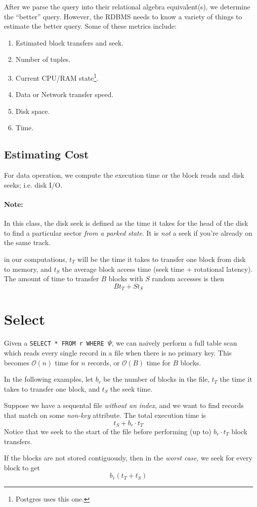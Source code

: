 \documentclass{report}
\newenvironment{example}{\begin{tcolorbox}[title={Example},colback=green!5!white,colframe=black!75!green]}{\end{tcolorbox}}
\renewcommand{\tt}[1]{\texttt{{#1}}}
\renewcommand{\it}[1]{\textit{{#1}}}
\begin{document}
After we parse the query into their relational algebra equivalent(s), we
determine the ``better'' query. However, the RDBMS needs to know a variety of
things to estimate the better query. Some of these metrics include:
\begin{enumerate}[label=(\arabic*)]
    \item Estimated block transfers and seek.
    \item Number of tuples.
    \item Current CPU/RAM state\footnote{Postgres uses this one.}.
    \item Data or Network transfer speed.
    \item Disk space.
    \item Time.
\end{enumerate}

\subsection{Estimating Cost}
For data operation, we compute the execution time or the block reads and disk
seeks; i.e. disk I/O.
\paragraph{Note:} In this class, the disk seek is defined as the time it takes
for the head of the disk to find a particular sector \it{from a parked state}.
It is \it{not} a seek if you're already on the same track.
\vspace{1em}

in our computations, $t_T$ will be the time it takes to transfer one block from
disk to memory, and $t_S$ the average block access time (seek time $+$
rotational latency). The amount of time to transfer $B$ blocks with $S$ random
accesses is then
\[Bt_T + St_S\]

\section{Select}
Given a \tt{SELECT * FROM r WHERE $\Psi$}, we can naively perform a full table
scan which reads every single record in a file when there is no primary key.
This becomes $\mathcal{O}(n)$ time for $n$ records, or $\mathcal{O}(B)$ time for
$B$ blocks.

In the following examples, let $b_r$ be the number of blocks in the file, $t_T$
the time it takes to transfer one block, and $t_S$ the seek time.
\begin{example}
    Suppose we have a sequental file \it{without an index}, and we want to find
    records that match on some \it{non-key} attribute. The total execution time is
    \[t_S + b_r \cdot t_T\]
    Notice that we seek to the start of the file before performing (up to)
    $b_r \cdot t_T$ block transfers.
    \vspace{1em}

    If the blocks are not stored contiguously, then in the \it{worst case}, we
    seek for every block to get
    \[b_r(t_T + t_S)\]
\end{example}
\end{document}
